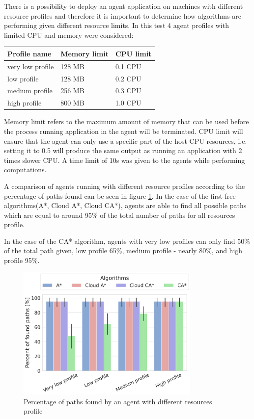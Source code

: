 There is a possibility to deploy an agent application on machines with different resource profiles and therefore it is important to determine how algorithms are performing given different resource limits.
In this test 4 agent profiles with limited CPU and memory were considered:
\begin{table}[H]
\label{tab:resorces_profile}
\centering
\begin{tabular}{@{}lll@{}}
\toprule
Profile name     & Memory limit & CPU limit \\ \midrule
very low profile & 128 MB        & 0.1 CPU   \\
low profile      & 128 MB        & 0.2 CPU   \\
medium profile   & 256 MB        & 0.3 CPU   \\
high profile     & 800 MB        & 1.0 CPU     \\ \bottomrule
\end{tabular}%
\end{table}

Memory limit refers to the maximum amount of memory that can be used before the process running application in the agent will be terminated. CPU limit will ensure that the agent can only use a specific part of the host CPU resources, i.e. setting it to 0.5 will produce the same output as running an application with 2 times slower CPU\cite{docker_container_limits}. A time limit of 10s was given to the agents while performing computations.

A comparison of agents running with different resource profiles according to the percentage of paths found can be seen in figure \ref{fig:compare_profiles_paths}. In the case of the first free algorithms(A*, Cloud A*, Cloud CA*), agents are able to find all possible paths which are equal to around 95\% of the total number of paths for all resources profile. 

In the case of the CA* algorithm, agents with very low profiles can only find 50\% of the total path given, low profile 65\%, medium profile - nearly 80\%, and high profile 95\%. 
\begin{figure}[H]
    \centering
    \includegraphics[width=0.8\textwidth]{pictures/compare_profiles_paths.png}
    \caption{Percentage of paths found by an agent with different resources profile
    }
    \label{fig:compare_profiles_paths}
\end{figure}

